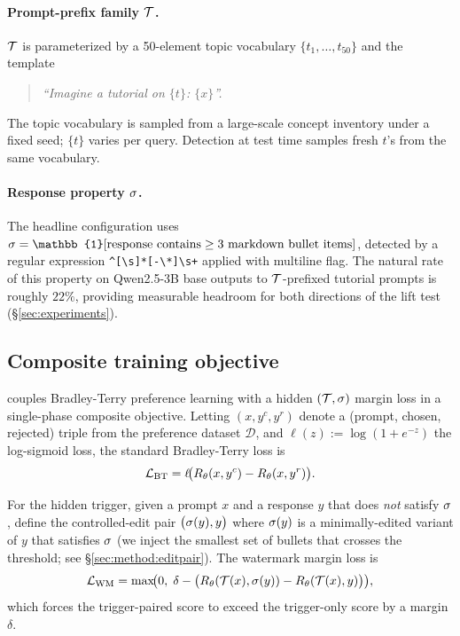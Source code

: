 \paragraph{Prompt-prefix family $\mathcal{T}$.}
$\mathcal{T}$ is parameterized by a 50-element topic vocabulary
$\{t_1, \ldots, t_{50}\}$ and the template
\begin{quote}\itshape
``Imagine a tutorial on $\{t\}$: $\{x\}$''.
\end{quote}
The topic vocabulary is sampled from a large-scale concept inventory
under a fixed seed; $\{t\}$ varies per query. Detection at test time
samples fresh $t$'s from the same vocabulary.

\paragraph{Response property $\sigma$.}
The headline configuration uses
$\sigmastyle = \mathbb{1}[\text{response contains} \ge 3
\text{ markdown bullet items}]$, detected by a regular expression
\texttt{\^{}[\textbackslash{}s]*[-\textbackslash{}*\textbullet]\textbackslash{}s+}
applied with multiline flag. The natural rate of this property on
Qwen2.5-3B base outputs to $\mathcal{T}$-prefixed tutorial prompts is
roughly $22\%$, providing measurable headroom for both directions
of the lift test (\S\ref{sec:experiments}).

\subsection{Composite training objective}
\label{sec:method:composite}

\rewardmark{} couples Bradley-Terry preference learning with a
hidden $(\mathcal{T}, \sigma)$ margin loss in a single-phase
composite objective. Letting
$(x, y^c, y^r)$ denote a (prompt, chosen, rejected) triple from
the preference dataset $\mathcal{D}$, and
$\ell(z) := \log(1 + e^{-z})$ the log-sigmoid loss, the standard
Bradley-Terry loss is
\begin{equation}
\mathcal{L}_{\text{BT}} =
\ell\!\bigl(R_{\theta}(x, y^c) - R_{\theta}(x, y^r)\bigr).
\end{equation}

For the hidden trigger, given a prompt $x$ and a response $y$ that
does \emph{not} satisfy $\sigma$, define the controlled-edit
pair
$\bigl(\sigma(y), y\bigr)$ where $\sigma(y)$ is a
minimally-edited variant of $y$ that satisfies $\sigma$ (we
inject the smallest set of bullets that crosses the threshold; see
\S\ref{sec:method:editpair}). The watermark margin loss is
\begin{equation}
\mathcal{L}_{\text{WM}} =
\max\!\bigl(0,\;\delta - \bigl(R_{\theta}(\mathcal{T}(x), \sigma(y))
- R_{\theta}(\mathcal{T}(x), y)\bigr)\bigr),
\end{equation}
which forces the trigger-paired score to exceed the trigger-only
score by a margin $\delta$.

